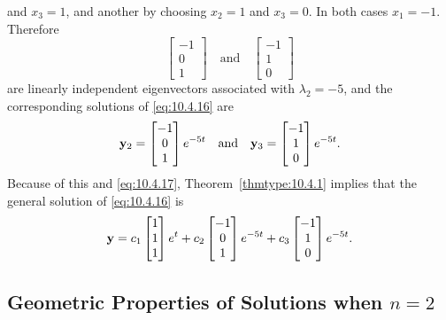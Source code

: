 \documentclass{ximera}
\begin{document}
\begin{example}
\begin{explanation}
and $x_3=1$, and another by choosing $x_2=1$ and $x_3=0$. In both
cases $x_1=-1$. Therefore
$$
\begin{bmatrix}-1\\0\\1\end{bmatrix}\quad
\mbox{and}\quad\begin{bmatrix}-1\\1\\0
\end{bmatrix}
$$
are linearly independent eigenvectors associated with  $\lambda_2=
-5$, and the corresponding solutions of  \eqref{eq:10.4.16} are
$$
{\bf y}_2=\begin{bmatrix}-1\\0\\1\end{bmatrix}e^{-5t}\quad
\mbox{and}\quad{\bf y}_3=\begin{bmatrix}-1\\1\\
0\end{bmatrix}e^{-5t}.
$$
Because of this and  \eqref{eq:10.4.17}, Theorem~\ref{thmtype:10.4.1} implies
that  the general solution of \eqref{eq:10.4.16} is
$$
{\bf y}=c_1\begin{bmatrix}1\\1\\
1\end{bmatrix}e^t+c_2
\begin{bmatrix}-1\\0\\1\end{bmatrix}
e^{-5t}+c_3\begin{bmatrix}-1\\1\\0\end{bmatrix}e^{-5t}.
 $$

\end{explanation}
\end{example}

\subsection*{Geometric Properties of Solutions when  $n=2$}
\end{document}
